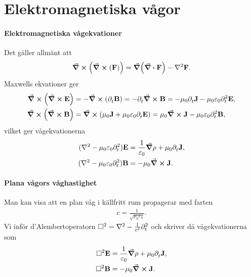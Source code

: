 \section{Elektromagnetiska vågor}

\paragraph{Elektromagnetiska vågekvationer}
Det gäller allmänt att
\begin{align*}
	\curl(\curl(\vb{F})) = \grad(\div{\vb{F}}) - \laplacian{\vb{F}}.
\end{align*}
Maxwells ekvationer ger
\begin{align*}
	\curl(\curl{\vb{E}}) &= -\curl(\del{t}{\vb{B}}) = -\del{t}{\curl{\vb{B}}} = -\mu_{0}\del{t}{\vb{J}} - \mu_{0}\varepsilon_{0}\del[2]{t}{\vb{E}}, \\
	\curl(\curl{\vb{B}}) &= \curl(\mu_{0}\vb{J} + \mu_{0}\varepsilon_{0}\del{t}{\vb{E}}) = \mu_{0}\curl{\vb{J}} - \mu_{0}\varepsilon_{0}\del[2]{t}{\vb{B}},
\end{align*}
vilket ger vågekvationerna
\begin{align*}
	(\laplacian - \mu_{0}\varepsilon_{0}\del[2]{t}{})\vb{E} &= \frac{1}{\varepsilon_{0}}\grad{\rho} + \mu_{0}\del{t}{\vb{J}}, \\
	(\laplacian - \mu_{0}\varepsilon_{0}\del[2]{t}{})\vb{B} &= -\mu_{0}\curl{\vb{J}}.
\end{align*}

\paragraph{Plana vågors våghastighet}
Man kan visa att en plan våg i källfritt rum propagerar med farten
\begin{align*}
	c = \frac{1}{\sqrt{\mu_{0}\varepsilon_{0}}}.
\end{align*}
Vi inför d'Alembertoperatorn $\dalemb{} = \laplacian{} - \frac{1}{c^{2}}\del[2]{t}{}$ och skriver då vågekvationerna som
\begin{align*}
	\dalemb{\vb{E}} &= \frac{1}{\varepsilon_{0}}\grad{\rho} + \mu_{0}\del{t}{\vb{J}}, \\
	\dalemb{\vb{B}} &= -\mu_{0}\curl{\vb{J}}.
\end{align*}

